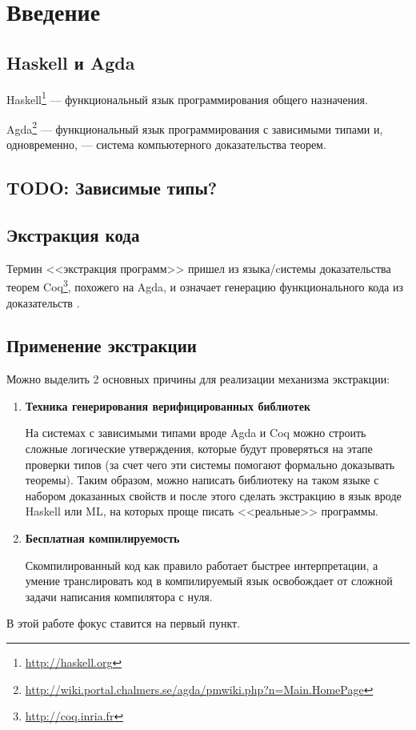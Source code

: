 \section{Введение}

\subsection{Haskell и Agda}

Haskell\footnote{\url{http://haskell.org}} --- функциональный язык программирования
общего назначения.

Agda\footnote{\url{http://wiki.portal.chalmers.se/agda/pmwiki.php?n=Main.HomePage}} ---
функциональный язык программирования с зависимыми типами и, одновременно, ---
система компьютерного доказательства теорем.

\subsection{TODO: Зависимые типы?}

\subsection{Экстракция кода}\label{sec:intro-extraction}

Термин <<экстракция программ>> пришел из языка/cистемы доказательства теорем
Coq\footnote{\url{http://coq.inria.fr}}, похожего на Agda, и означает генерацию
функционального кода из доказательств \cite{Let02}.

\subsection{Применение экстракции}

Можно выделить 2 основных причины для реализации механизма экстракции:
\begin{enumerate}
\item \textbf{Техника генерирования верифицированных библиотек}

      На системах с зависимыми типами вроде Agda и Coq можно строить
      сложные логические утверждения, которые будут проверяться на этапе
      проверки типов (за счет чего эти системы помогают формально доказывать теоремы).
      Таким образом, можно написать библиотеку на таком языке с набором доказанных
      свойств и после этого сделать экстракцию в язык вроде Haskell или ML,
      на которых проще писать <<реальные>> программы.

\item \textbf{Бесплатная компилируемость}

      Скомпилированный код как правило работает быстрее интерпретации, а умение
      транслировать код в компилируемый язык освобождает от сложной задачи
      написания компилятора с нуля.
\end{enumerate}

В этой работе фокус ставится на первый пункт.
